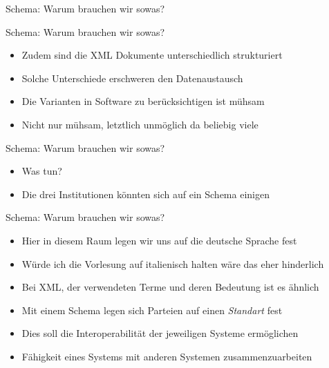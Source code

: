 \documentclass{beamer}
\begin{document}
\begin{frame}{Schema: Warum brauchen wir sowas?}
	
	
\end{frame}

\begin{frame}{Schema: Warum brauchen wir sowas?}
	
	\begin{itemize}
		\item Zudem sind die XML Dokumente unterschiedlich strukturiert
		\item Solche Unterschiede erschweren den Datenaustausch
		\item Die Varianten in Software zu berücksichtigen ist mühsam
		\item Nicht nur mühsam, letztlich unmöglich da beliebig viele
	\end{itemize}
	
\end{frame}

\begin{frame}{Schema: Warum brauchen wir sowas?}
	
	\begin{itemize}
		\item Was tun? 
		\item Die drei Institutionen könnten sich auf ein Schema einigen
	\end{itemize}
	
\end{frame}

\begin{frame}{Schema: Warum brauchen wir sowas?}
	
	\begin{itemize}
		\item Hier in diesem Raum legen wir uns auf die deutsche Sprache fest
		\item Würde ich die Vorlesung auf italienisch halten wäre das eher hinderlich
		\item Bei XML, der verwendeten Terme und deren Bedeutung ist es ähnlich
		\item Mit einem Schema legen sich Parteien auf einen \emph{Standart} fest
		\item Dies soll die Interoperabilität der jeweiligen Systeme ermöglichen
		\item Fähigkeit eines Systems mit anderen Systemen zusammenzuarbeiten
	\end{itemize}
	
\end{frame}
\end{document}
